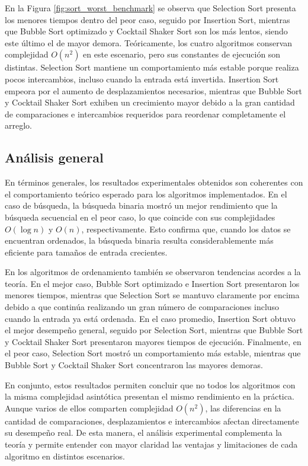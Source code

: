 En la Figura \ref{fig:sort_worst_benchmark} se observa que Selection Sort presenta los menores tiempos dentro del peor caso, seguido por Insertion Sort, mientras que Bubble Sort optimizado y Cocktail Shaker Sort son los más lentos, siendo este último el de mayor demora. Teóricamente, los cuatro algoritmos conservan complejidad \(O(n^2)\) en este escenario, pero sus constantes de ejecución son distintas. Selection Sort mantiene un comportamiento más estable porque realiza pocos intercambios, incluso cuando la entrada está invertida. Insertion Sort empeora por el aumento de desplazamientos necesarios, mientras que Bubble Sort y Cocktail Shaker Sort exhiben un crecimiento mayor debido a la gran cantidad de comparaciones e intercambios requeridos para reordenar completamente el arreglo.

\newpage
\subsection{Análisis general}
En términos generales, los resultados experimentales obtenidos son coherentes con el comportamiento teórico esperado para los algoritmos implementados. En el caso de búsqueda, la búsqueda binaria mostró un mejor rendimiento que la búsqueda secuencial en el peor caso, lo que coincide con sus complejidades \(O(\log n)\) y \(O(n)\), respectivamente. Esto confirma que, cuando los datos se encuentran ordenados, la búsqueda binaria resulta considerablemente más eficiente para tamaños de entrada crecientes.

En los algoritmos de ordenamiento también se observaron tendencias acordes a la teoría. En el mejor caso, Bubble Sort optimizado e Insertion Sort presentaron los menores tiempos, mientras que Selection Sort se mantuvo claramente por encima debido a que continúa realizando un gran número de comparaciones incluso cuando la entrada ya está ordenada. En el caso promedio, Insertion Sort obtuvo el mejor desempeño general, seguido por Selection Sort, mientras que Bubble Sort y Cocktail Shaker Sort presentaron mayores tiempos de ejecución. Finalmente, en el peor caso, Selection Sort mostró un comportamiento más estable, mientras que Bubble Sort y Cocktail Shaker Sort concentraron las mayores demoras.

En conjunto, estos resultados permiten concluir que no todos los algoritmos con la misma complejidad asintótica presentan el mismo rendimiento en la práctica. Aunque varios de ellos comparten complejidad \(O(n^2)\), las diferencias en la cantidad de comparaciones, desplazamientos e intercambios afectan directamente su desempeño real. De esta manera, el análisis experimental complementa la teoría y permite entender con mayor claridad las ventajas y limitaciones de cada algoritmo en distintos escenarios.